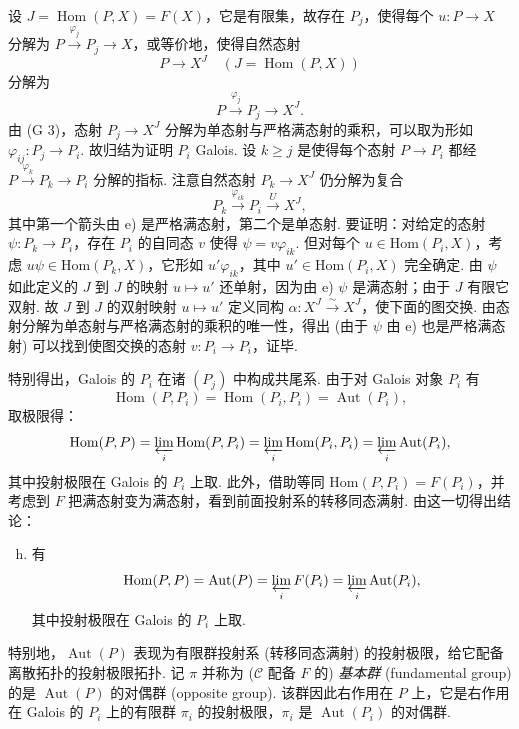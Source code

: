 设 $J = \operatorname{Hom}(P, X) = F(X)$，它是有限集，故存在 $P_j$，使得每个 $u \colon P \to X$ 分解为 $P \xrightarrow{\varphi_j} P_j \longrightarrow X$，或等价地，使得自然态射
\[
P \longrightarrow X^{J} \quad (J = \operatorname{Hom}(P, X))
\]
分解为
\[
P \xrightarrow{\varphi_j} P_j \longrightarrow X^{J}.
\]
由 (G 3)，态射 $P_j \to X^{J}$ 分解为单态射与严格满态射的乘积，可以取为形如 $\varphi_{ij} \colon P_j \to P_i$. 故归结为证明 $P_i$ Galois. 设 $k \geqslant j$ 是使得每个态射 $P \to P_i$ 都经 $P \stackrel{\varphi_k}{\longrightarrow} P_k \longrightarrow P_i$ 分解的指标. 注意自然态射 $P_k \to X^{J}$ 仍分解为复合
\[
P_k \xrightarrow{\varphi_{ik}} P_i \xrightarrow{U} X^{J},
\]
其中第一个箭头由 e) 是严格满态射，第二个是单态射. 要证明：对给定的态射 $\psi \colon P_k \to P_i$，存在 $P_i$ 的自同态 $v$ 使得 $\psi = v\varphi_{ik}$. 但对每个 $u \in \mathrm{Hom}(P_i, X)$，考虑 $u\psi \in \mathrm{Hom}(P_k, X)$，它形如 $u'\varphi_{ik}$，其中 $u' \in \mathrm{Hom}(P_i, X)$ 完全确定. 由 $\psi$ 如此定义的 $J$ 到 $J$ 的映射 $u \mapsto u'$ 还单射，因为由 e) $\psi$ 是满态射；由于 $J$ 有限它双射. 故 $J$ 到 $J$ 的双射映射 $u \mapsto u'$ 定义同构 $\alpha \colon X^{J} \xrightarrow{\sim} X^{J}$，使下面的图交换. 由态射分解为单态射与严格满态射的乘积的唯一性，得出 (由于 $\psi$ 由 e) 也是严格满态射) 可以找到使图交换的态射 $v \colon P_i \to P_i$，证毕.

特别得出，Galois 的 $P_i$ 在诸 $(P_j)$ 中构成共尾系. 由于对 Galois 对象 $P_i$ 有
\[
\operatorname{Hom}(P, P_i) = \operatorname{Hom}(P_i, P_i) = \operatorname{Aut}(P_i),
\]
取极限得：
\[
\operatorname{Hom}(P, P) = \varprojlim_{i} \operatorname{Hom}(P, P_i) = \varprojlim_{i} \operatorname{Hom}(P_i, P_i) = \varprojlim_{i} \operatorname{Aut}(P_i),
\]
其中投射极限在 Galois 的 $P_i$ 上取. 此外，借助等同 $\mathrm{Hom}(P, P_i) = F(P_i)$，并考虑到 $F$ 把满态射变为满态射，看到前面投射系的转移同态满射. 由这一切得出结论：

\begin{enumerate}[a)]
\setcounter{enumi}{7}
\item 有
\[
\operatorname{Hom}(P, P) = \operatorname{Aut}(P) = \varprojlim_{i} F(P_i) = \varprojlim_{i} \operatorname{Aut}(P_i),
\]
其中投射极限在 Galois 的 $P_i$ 上取.
\end{enumerate}

特别地，$\operatorname{Aut}(P)$ 表现为有限群投射系 (转移同态满射) 的投射极限，给它配备离散拓扑的投射极限拓扑. 记 $\pi$ 并称为\index[notations]{$\pi$} ($\mathcal{C}$ 配备 $F$ 的) \emph{基本群} (fundamental group) 的是 $\operatorname{Aut}(P)$ 的对偶群 (opposite group). 该群因此右作用在 $P$ 上，它是右作用在 Galois 的 $P_i$ 上的有限群 $\pi_i$ 的投射极限，$\pi_i$ 是 $\operatorname{Aut}(P_i)$ 的对偶群.

